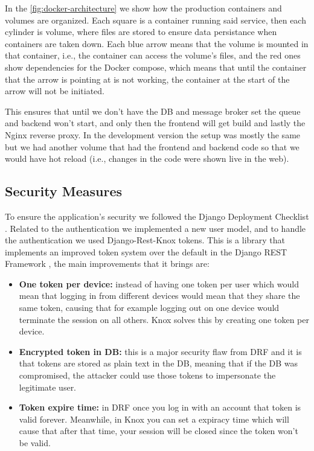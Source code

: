 In the \autoref{fig:docker-architecture} we show how the production containers and volumes are organized.
Each square is a container running said service,
then each cylinder is volume, where files are stored to ensure data persistance when containers are taken down.
Each blue arrow means that the volume is mounted in that container, i.e., the container can access the volume's files,
and the red ones show dependencies for the Docker compose,
which means that until the container that the arrow is pointing at is not working,
the container at the start of the arrow will not be initiated.

This ensures that until we don't have the \ac{DB} and message broker set
the queue and backend won't start,
and only then the frontend will get build
and lastly the Nginx reverse proxy.
In the development version the setup was mostly the same
but we had another volume that had the frontend and backend code
so that we would have hot reload (i.e., changes in the code were shown live in the web).

\subsection{Security Measures}

To ensure the application's security we followed the Django Deployment Checklist \autocite{DeploymentChecklistDjango}.
Related to the authentication we implemented a new user model,
and to handle the authentication we used Django-Rest-Knox \autocite{DjangoRestKnox} tokens.
This is a library that implements an improved token system over the default in the Django REST Framework \autocite{DjangoRESTFramework},
the main improvements that it brings are:
\begin{itemize}
  \item \textbf{One token per device:}
    instead of having one token per user
    which would mean that logging in from different devices
    would mean that they share the same token,
    causing that for example
    logging out on one device would terminate the session on all others.
    Knox solves this by creating one token per device.

  \item \textbf{Encrypted token in \ac{DB}:}
    this is a major security flaw from \ac{DRF}
    and it is that tokens are stored as plain text in the \ac{DB},
    meaning that if the \ac{DB} was compromised,
    the attacker could use those tokens to impersonate the legitimate user.

  \item \textbf{Token expire time:}
    in \ac{DRF} once you log in with an account that token is valid forever.
    Meanwhile, in Knox you can set a expiracy time which will cause that after that time,
    your session will be closed since the token won't be valid.
\end{itemize}

